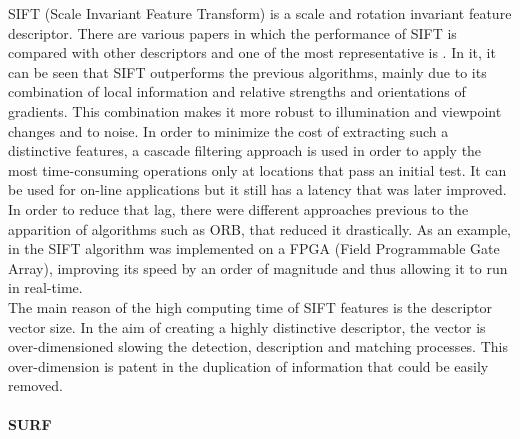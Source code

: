 SIFT (Scale Invariant Feature Transform) is a scale and rotation invariant feature descriptor\cite{sift}. 
There are various papers in which the performance of SIFT is compared with other descriptors and one of the most representative is \cite{Mikolajczyk2005}. In it, it can be seen that SIFT 
outperforms the previous algorithms, mainly due to its combination of local information and relative strengths and orientations of gradients. This combination makes it more robust to illumination and viewpoint changes and to noise. 
In order to minimize the cost of extracting such a distinctive features, a cascade filtering approach is used in order to apply the most time-consuming operations only at locations that pass an initial test. 
It can be used for on-line applications but it still has a latency that was later improved. 
In order to reduce that lag, there were different approaches previous to the apparition of algorithms such as ORB, that reduced it drastically\cite{orb}. 
As an example, in \cite{sift_fpga} the SIFT algorithm was implemented on a FPGA (Field Programmable Gate Array), improving its speed by an order of magnitude and thus allowing it to run in real-time.
\\

The main reason of the high computing time of SIFT features is the descriptor vector size. 
In the aim of creating a highly distinctive descriptor, the vector is over-dimensioned slowing the detection, description and matching processes. 
This over-dimension is patent in the duplication of information that could be easily removed. 




\paragraph{SURF}\mbox{}\\

